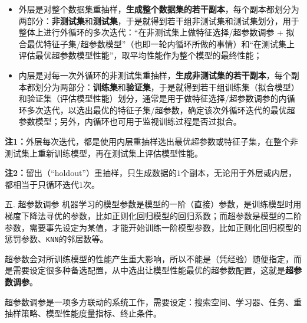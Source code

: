 \documentclass[
  11pt,
  ignorenonframetext,
  dvipsnames,UTF8]{beamer}
\begin{document}
\begin{frame}{}
\protect\hypertarget{section-29}{}
\begin{itemize}
\item
  外层是对整个数据集重抽样，\textbf{生成整个数据集的若干副本}，每个副本都划分为两部分：\textbf{非测试集}和\textbf{测试集}，于是就得到若干组非测试集和测试集划分，用于整体上进行外循环的多次迭代：``在非测试集上做特征选择/超参数调参
  +
  拟合最优特征子集/超参数模型''（也即一轮内循环所做的事情）和``在测试集上评估最优超参数模型性能''，取平均性能作为整个模型的最终性能；
\item
  内层是对每一次外循环的非测试集重抽样，\textbf{生成非测试集的若干副本}，每个副本都划分为两部分：\textbf{训练集}和\textbf{验证集}，于是就得到若干组训练集（拟合模型）和验证集（评估模型性能）划分，通常是用于做特征选择/超参数调参的内循环多次迭代，以选出最优的特征子集/超参数，确定该次外循环迭代的最优超参数模型；另外，内循环也可用于监视训练过程是否过拟合。
\end{itemize}
\end{frame}

\begin{frame}{}
\protect\hypertarget{section-30}{}
\textbf{注1：}外层每次迭代，都是使用内层重抽样选出最优超参数或特征子集，在整个非测试集上重新训练模型，再在测试集上评估模型性能。

\textbf{注2：}留出（``holdout''）重抽样，只生成数据的\(1\)个副本，无论用于外层或内层，都相当于只循环迭代\(1\)次。
\end{frame}

\begin{frame}[fragile]{五. 超参数调参}
\protect\hypertarget{ux4e94.-ux8d85ux53c2ux6570ux8c03ux53c2}{}
机器学习的模型参数是模型的一阶（直接）参数，是训练模型时用梯度下降法寻优的参数，比如正则化回归模型的回归系数；而超参数是模型的二阶参数，需要事先设定为某值，才能开始训练一阶模型参数，比如正则化回归模型的惩罚参数、\texttt{KNN}的邻居数等。

超参数会对所训练模型的性能产生重大影响，所以不能是（凭经验）随便指定，而是需要设定很多种备选配置，从中选出让模型性能最优的超参数配置，这就是\textbf{超参数调参}。

超参数调参是一项多方联动的系统工作，需要设定：搜索空间、学习器、任务、重抽样策略、模型性能度量指标、终止条件。
\end{frame}
\end{document}
